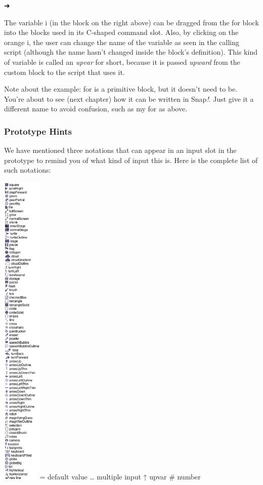 ➜

The variable i (in the block on the right above) can be dragged from the
for block into the blocks used in its C-shaped command slot. Also, by
clicking on the orange i, the user can change the name of the variable
as seen in the calling script (although the name hasn't changed inside
the block's definition). This kind of variable is called an \emph{upvar}
for short, because it is passed \emph{upward} from the custom block to
the script that uses it.

Note about the example: for is a primitive block, but it doesn't need to
be. You're about to see (next chapter) how it can be written in
Snap\emph{!}. Just give it a different name to avoid confusion, such as
my for as above.

\subsubsection{Prototype Hints}\label{prototype-hints}

We have mentioned three notations that can appear in an input slot in
the prototype to remind you of what kind of input this is. Here is the
complete list of such notations:

\includegraphics[width=0.73472in,height=6.11806in]{media/image685.png}=
default value \ldots{} multiple input ↑ upvar \# number

